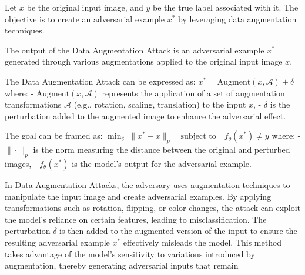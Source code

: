 Let $x$ be the original input image, and $y$ be the true label associated with it. The objective is to create an adversarial example $x^*$ by leveraging data augmentation techniques.

The output of the Data Augmentation Attack is an adversarial example $x^*$ generated through various augmentations applied to the original input image $x$.

The Data Augmentation Attack can be expressed as:
$x^* = \text{Augment}(x, \mathcal{A}) + \delta$
where:
- $\text{Augment}(x, \mathcal{A})$ represents the application of a set of augmentation transformations $\mathcal{A}$ (e.g., rotation, scaling, translation) to the input $x$,
- $\delta$ is the perturbation added to the augmented image to enhance the adversarial effect.

The goal can be framed as:
$\min_{\delta} \; \|x^* - x\|_p \quad \text{subject to} \quad f_\theta(x^*) \neq y$
where:
- $\|\cdot\|_p$ is the norm measuring the distance between the original and perturbed images,
- $f_\theta(x^*)$ is the model's output for the adversarial example.

In Data Augmentation Attacks, the adversary uses augmentation techniques to manipulate the input image and create adversarial examples. By applying transformations such as rotation, flipping, or color changes, the attack can exploit the model's reliance on certain features, leading to misclassification. The perturbation $\delta$ is then added to the augmented version of the input to ensure the resulting adversarial example $x^*$ effectively misleads the model. This method takes advantage of the model's sensitivity to variations introduced by augmentation, thereby generating adversarial inputs that remain 
